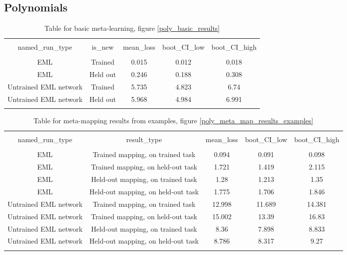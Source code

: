 \subsection{Polynomials}
\begin{table}[H]
\scriptsize
\centering
\begin{tabular}{@{\extracolsep{5pt}} ccccc}
\\[-1.8ex]\hline
\hline \\[-1.8ex]
named\_run\_type & is\_new & mean\_loss & boot\_CI\_low & boot\_CI\_high \\
\hline \\[-1.8ex]
EML & Trained & 0.015 & 0.012 & 0.018 \\
EML & Held out & 0.246 & 0.188 & 0.308 \\
Untrained EML network & Trained & 5.735 & 4.823 & 6.74 \\
Untrained EML network & Held out & 5.968 & 4.984 & 6.991 \\
\hline \\[-1.8ex]
\end{tabular}
\caption{Table for basic meta-learning, figure \ref{poly_basic_results}}
\end{table}

\begin{table}[H]
\scriptsize
\centering
\begin{tabular}{@{\extracolsep{5pt}} ccccc}
\\[-1.8ex]\hline
\hline \\[-1.8ex]
named\_run\_type & result\_type & mean\_loss & boot\_CI\_low & boot\_CI\_high \\
\hline \\[-1.8ex]
EML & Trained mapping, on trained task & 0.094 & 0.091 & 0.098 \\
EML & Trained mapping, on held-out task & 1.721 & 1.419 & 2.115 \\
EML & Held-out mapping, on trained task & 1.28 & 1.213 & 1.35 \\
EML & Held-out mapping, on held-out task & 1.775 & 1.706 & 1.846 \\
Untrained EML network & Trained mapping, on trained task & 12.998 & 11.689 & 14.381 \\
Untrained EML network & Trained mapping, on held-out task & 15.002 & 13.39 & 16.83 \\
Untrained EML network & Held-out mapping, on trained task & 8.36 & 7.898 & 8.833 \\
Untrained EML network & Held-out mapping, on held-out task & 8.786 & 8.317 & 9.27 \\
\hline \\[-1.8ex]
\end{tabular}
\caption{Table for meta-mapping results from examples, figure \ref{poly_meta_map_results_examples}}
\end{table}

